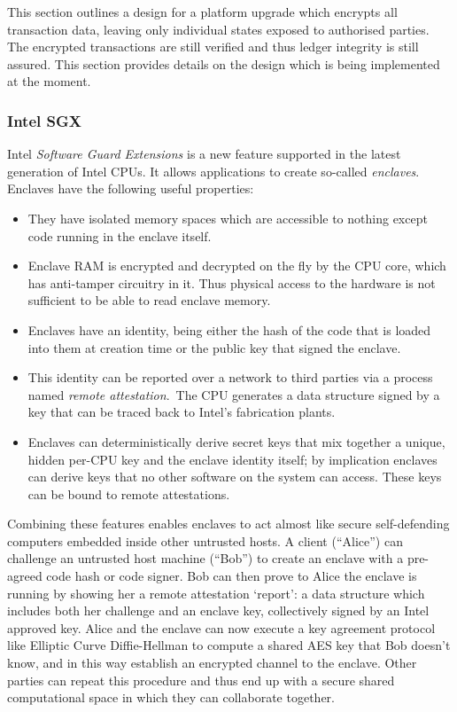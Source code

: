 \documentclass{article}
\begin{document}
This section outlines a design for a platform upgrade which encrypts all transaction data, leaving only individual
states exposed to authorised parties. The encrypted transactions are still verified and thus ledger integrity is
still assured. This section provides details on the design which is being implemented at the moment.

\subsubsection{Intel SGX}\label{subsec:sgx}

Intel \emph{Software Guard Extensions}\cite{SGX} is a new feature supported in the latest generation of Intel CPUs.
It allows applications to create so-called \emph{enclaves}. Enclaves have the following useful properties:

\begin{itemize}
    \item They have isolated memory spaces which are accessible to nothing except code running in the enclave
          itself.
    \item Enclave RAM is encrypted and decrypted on the fly by the CPU core, which has anti-tamper
          circuitry in it. Thus physical access to the hardware is not sufficient to be able to read enclave memory.
    \item Enclaves have an identity, being either the hash of the code that is loaded into them at creation time
          or the public key that signed the enclave.
    \item This identity can be reported over a network to third parties via a process named \emph{remote attestation}.\
          The CPU generates a data structure signed by a key that can be traced back to Intel's fabrication plants.
    \item Enclaves can deterministically derive secret keys that mix together a unique, hidden per-CPU key and the
          enclave identity itself; by implication enclaves can derive keys that no other software on the system can
          access. These keys can be bound to remote attestations.
\end{itemize}

Combining these features enables enclaves to act almost like secure self-defending computers embedded inside other
untrusted hosts. A client (``Alice'') can challenge an untrusted host machine (``Bob'') to create an enclave with a
pre-agreed code hash or code signer. Bob can then prove to Alice the enclave is running by showing her a remote
attestation `report': a data structure which includes both her challenge and an enclave key, collectively signed by
an Intel approved key. Alice and the enclave can now execute a key agreement protocol like Elliptic
Curve Diffie-Hellman to compute a shared AES key that Bob doesn't know, and in this way establish an encrypted
channel to the enclave. Other parties can repeat this procedure and thus end up with a secure shared computational
space in which they can collaborate together.
\end{document}
